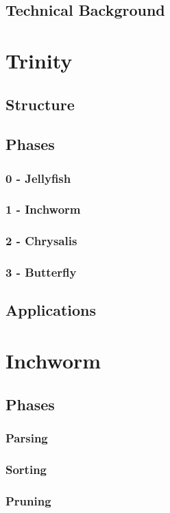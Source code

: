 \documentclass[plainarticle,zihtitle,english,final,hyperref,utf8]{zihpub}
\begin{document}
\subsection{Technical Background}
\section{Trinity}
\subsection{Structure}
\subsection{Phases}
\subsubsection{0 - Jellyfish}
\subsubsection{1 - Inchworm}
\subsubsection{2 - Chrysalis}
\subsubsection{3 - Butterfly}
\subsection{Applications}

\section{Inchworm}
\subsection{Phases}
\subsubsection{Parsing}
\subsubsection{Sorting}
\subsubsection{Pruning}
\end{document}
